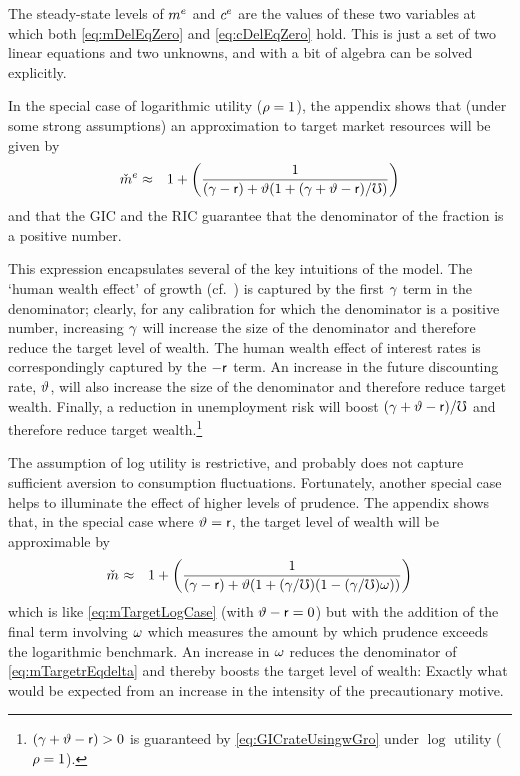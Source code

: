 \documentclass{handout}
\begin{document}
The steady-state levels of $m^{e}$ and $c^{e}$ are the values of these two variables at which both
\eqref{eq:mDelEqZero} and \eqref{eq:cDelEqZero} hold.  This is
just a set of two linear equations and two unknowns, and with a bit of 
algebra can be solved explicitly.

In the special case of logarithmic utility ($\rho = 1$), the
appendix shows that (under some strong assumptions) an approximation to target market resources will be given by
\begin{eqnarray}
 \check{m}^{e} & \approx & 1 + \left(\frac{1}{(\gamma-\mathsf{r})+\vartheta(1+(\gamma+\vartheta-\mathsf{r})/\mho)}\right) \label{eq:mTargetLogCase}
\end{eqnarray}
and that the GIC and the RIC guarantee that the denominator of the fraction is a positive number.

This expression encapsulates several of the key intuitions of the model.  The
`human wealth effect' of growth (cf.\ \cite{summersCapTax}) is captured by the first $\gamma$ term in the denominator;
clearly, for any calibration for which the denominator is a positive number, increasing
$\gamma$ will increase the size of the denominator and therefore reduce the target
level of wealth.  The human wealth effect of interest rates is  correspondingly captured
by the $-\mathsf{r}$ term.  An increase in the future discounting rate, $\vartheta$, will also
increase the size of the denominator and therefore reduce target wealth.  Finally,
a reduction in unemployment risk will boost $(\gamma+\vartheta-\mathsf{r})/\mho$ and therefore reduce target
wealth.\footnote{$(\gamma+\vartheta-\mathsf{r}) > 0$ is guaranteed by \eqref{eq:GICrateUsingwGro} under $\log$ utility ($\rho=1$).}

The assumption of log utility is restrictive, and probably does not capture
sufficient aversion to consumption fluctuations.  Fortunately, another special
case helps to illuminate the effect of higher levels of prudence.  The appendix shows that, in the special case where $\vartheta=\mathsf{r}$, the
target level of wealth will be approximable by
\begin{eqnarray}
 \mTarg^{\null} & \approx & 1 + \left(\frac{1}{(\pGro-\rfree)+\timeRate(1+(\pGro/\urate)(1-(\pGro/\urate)\prudEx))}\right) \label{eq:mTargetrEqdelta}
\end{eqnarray}
which is like \eqref{eq:mTargetLogCase} (with $\vartheta-\mathsf{r}=0$) but with the addition of the final term involving $\omega$ which measures the amount by which prudence exceeds the logarithmic benchmark.
An increase in $\omega$ reduces the denominator of \eqref{eq:mTargetrEqdelta}
and thereby boosts the target level of wealth: Exactly what would be expected from
an increase in the intensity of the precautionary motive.
\end{document}

